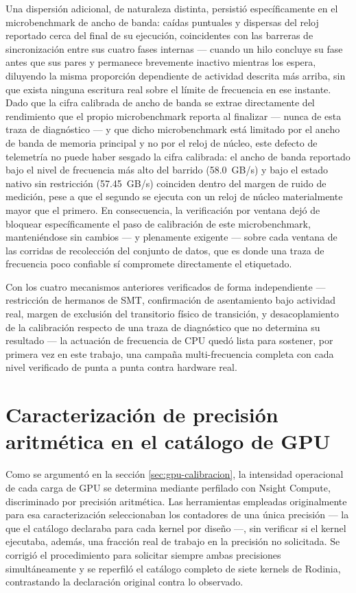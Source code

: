 \documentclass[12pt,oneside,spanish]{book}
\begin{document}
Una dispersión adicional, de naturaleza distinta, persistió específicamente en el microbenchmark de ancho de banda: caídas puntuales y dispersas del reloj reportado cerca del final de su ejecución, coincidentes con las barreras de sincronización entre sus cuatro fases internas --- cuando un hilo concluye su fase antes que sus pares y permanece brevemente inactivo mientras los espera, diluyendo la misma proporción dependiente de actividad descrita más arriba, sin que exista ninguna escritura real sobre el límite de frecuencia en ese instante. Dado que la cifra calibrada de ancho de banda se extrae directamente del rendimiento que el propio microbenchmark reporta al finalizar --- nunca de esta traza de diagnóstico --- y que dicho microbenchmark está limitado por el ancho de banda de memoria principal y no por el reloj de núcleo, este defecto de telemetría no puede haber sesgado la cifra calibrada: el ancho de banda reportado bajo el nivel de frecuencia más alto del barrido (58.0~GB/s) y bajo el estado nativo sin restricción (57.45~GB/s) coinciden dentro del margen de ruido de medición, pese a que el segundo se ejecuta con un reloj de núcleo materialmente mayor que el primero. En consecuencia, la verificación por ventana dejó de bloquear específicamente el paso de calibración de este microbenchmark, manteniéndose sin cambios --- y plenamente exigente --- sobre cada ventana de las corridas de recolección del conjunto de datos, que es donde una traza de frecuencia poco confiable sí compromete directamente el etiquetado.

Con los cuatro mecanismos anteriores verificados de forma independiente --- restricción de hermanos de SMT, confirmación de asentamiento bajo actividad real, margen de exclusión del transitorio físico de transición, y desacoplamiento de la calibración respecto de una traza de diagnóstico que no determina su resultado --- la actuación de frecuencia de CPU quedó lista para sostener, por primera vez en este trabajo, una campaña multi-frecuencia completa con cada nivel verificado de punta a punta contra hardware real.

\section{Caracterización de precisión aritmética en el catálogo de GPU}
\label{sec:resultados-precision-gpu}

Como se argumentó en la sección \ref{sec:gpu-calibracion}, la intensidad operacional de cada carga de GPU se determina mediante perfilado con Nsight Compute, discriminado por precisión aritmética. Las herramientas empleadas originalmente para esa caracterización seleccionaban los contadores de una única precisión --- la que el catálogo declaraba para cada kernel por diseño ---, sin verificar si el kernel ejecutaba, además, una fracción real de trabajo en la precisión no solicitada. Se corrigió el procedimiento para solicitar siempre ambas precisiones simultáneamente y se reperfiló el catálogo completo de siete kernels de Rodinia, contrastando la declaración original contra lo observado.
\end{document}
